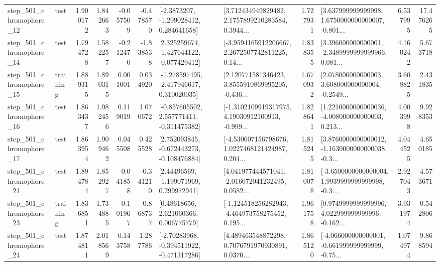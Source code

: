 \begin{tabular}{llrrrrllrlrr}
  step\_501\_chromophore\_12 &      test &      1.900172 &    1.842663 &     -0.057509 & -0.478570 &     [-2.3873207, -1.299028412, 0.284641658] &  [3.712434949829482, 2.1757899210283584, 0.3944... &       1.727931 &  [3.637999999999998, 1.6750000000000007, -0.801... &            6.537995 &         17.476265 \\
  step\_501\_chromophore\_14 &      test &      1.794728 &    1.582257 &     -0.212470 & -1.838538 &   [2.325259674, -1.427644122, -0.077429412] &  [-3.9594165912206667, 2.2672507742811225, 0.14... &       1.838355 &  [3.396000000000001, -2.3489999999999966, 0.081... &            4.160242 &          5.673718 \\
  step\_501\_chromophore\_15 &  training &      1.889315 &    1.890315 &      0.001001 &  0.034920 &   [-1.278597495, -2.417946617, 0.310020035] &  [2.120771581346423, 3.8555910869995205, -0.436... &       1.670932 &  [2.078000000000003, 3.608000000000004, -0.2549... &            3.608825 &          2.431835 \\
  step\_501\_chromophore\_16 &      test &      1.863437 &    1.982456 &      0.119019 &  1.070672 &   [-0.857605502, 2.557771411, -0.311475382] &  [-1.3102109919317975, 4.19030912100913, -0.999... &       1.828641 &  [1.2210000000000036, -4.008000000000003, 0.213... &            4.003998 &          9.928353 \\
  step\_501\_chromophore\_17 &      test &      1.863954 &    1.909462 &      0.045508 &  0.425528 &   [2.752093845, -0.672443273, -0.108476884] &  [-4.530607156798676, 1.0227468121424987, 0.204... &       1.815245 &  [3.8760000000000012, -1.1630000000000038, -0.3... &            4.044525 &          4.650185 \\
  step\_501\_chromophore\_21 &      test &      1.894784 &    1.852927 &     -0.041858 & -0.341210 &     [2.44496569, -1.199071969, 0.299972941] &  [4.041977444571041, -2.016072041232495, 0.0582... &       1.810078 &  [-3.6500000000000004, 1.9939999999999998, -0.3... &            2.927043 &          4.573671 \\
  step\_501\_chromophore\_23 &  training &      1.836851 &    1.734885 &     -0.101967 & -0.868737 &      [0.48618656, 2.621060366, 0.006775779] &  [-1.124518256282943, -4.464973758275452, 0.195... &       1.961758 &  [0.9749999999999996, 4.022999999999996, -0.162... &            3.931974 &          0.542806 \\
  step\_501\_chromophore\_24 &      test &      1.874811 &    2.018569 &      0.143758 &  1.287786 &   [-2.70283968, -0.394511922, -0.471317286] &  [4.489463548872298, 0.7076791970930891, 0.0370... &       1.865120 &  [-4.066000000000001, -0.661999999999999, -0.75... &            1.074974 &          9.868594 \\

\end{tabular}
